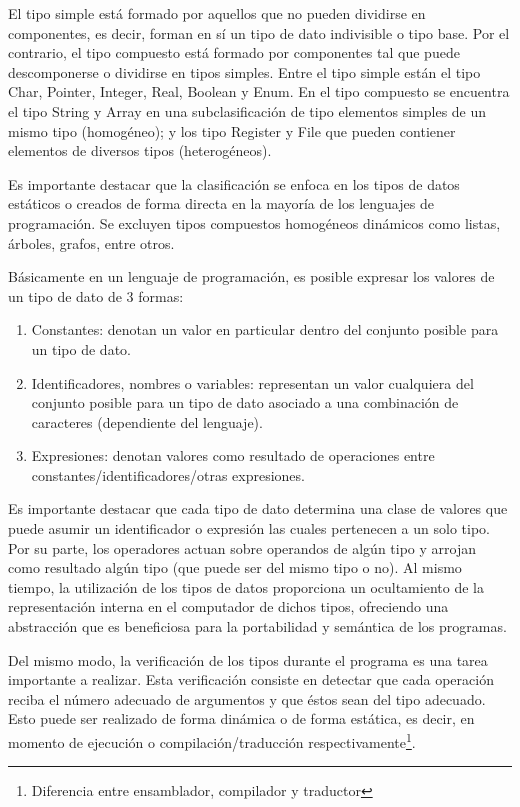 El tipo simple está formado por aquellos que no pueden dividirse en componentes, es decir, forman en sí un tipo de dato indivisible o tipo base. Por el contrario, el tipo compuesto está formado por componentes tal que puede descomponerse o dividirse en tipos simples. Entre el tipo simple están el tipo Char, Pointer, Integer, Real, Boolean y Enum. En el tipo compuesto se encuentra el tipo String y Array en una subclasificación de tipo elementos simples de un mismo tipo (homogéneo); y los tipo Register y File que pueden contiener elementos de diversos tipos (heterogéneos).

Es importante destacar que la clasificación se enfoca en los tipos de datos estáticos o creados de forma directa en la mayoría de los lenguajes de programación. Se excluyen tipos compuestos homogéneos dinámicos como listas, árboles, grafos, entre otros.

Básicamente en un lenguaje de programación, es posible expresar los valores de un tipo de dato de 3 formas:
\begin{enumerate}
\item Constantes: denotan un valor en particular dentro del conjunto posible para un tipo de dato.
\item Identificadores, nombres o variables: representan un valor cualquiera del conjunto posible para un tipo de dato asociado a una combinación de caracteres (dependiente del lenguaje).
\item Expresiones: denotan valores como resultado de operaciones entre constantes/identificadores/otras expresiones.
\end{enumerate}

Es importante destacar que cada tipo de dato determina una clase de valores que puede asumir un identificador o expresión las cuales pertenecen a un solo tipo. Por su parte, los operadores actuan sobre operandos de algún tipo y arrojan como resultado algún tipo (que puede ser del mismo tipo o no). Al mismo tiempo, la utilización de los tipos de datos proporciona un ocultamiento de la representación interna en el computador de dichos tipos, ofreciendo una abstracción que es beneficiosa para la portabilidad y semántica de los programas.

Del mismo modo, la verificación de los tipos durante el programa es una tarea importante a realizar. Esta verificación consiste en detectar que cada operación reciba el número adecuado de argumentos y que éstos sean del tipo adecuado. Esto puede ser realizado de forma dinámica o de forma estática, es decir, en momento de ejecución o compilación/traducción respectivamente\footnote{Diferencia entre ensamblador, compilador y traductor}.

